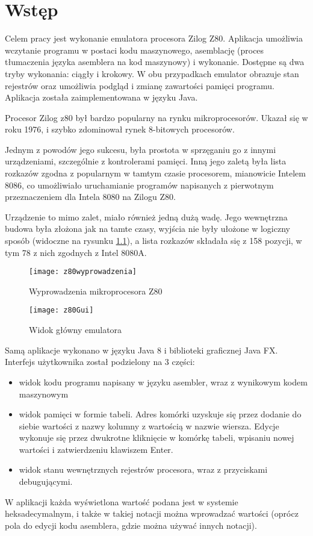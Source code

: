 \chapter{Wstęp}

	Celem pracy jest wykonanie emulatora procesora Zilog Z80. Aplikacja umożliwia wczytanie programu w postaci kodu maszynowego, asemblację (proces tłumaczenia języka asemblera na kod maszynowy) i wykonanie. Dostępne są dwa tryby wykonania: ciągły i krokowy. W obu przypadkach emulator obrazuje stan rejestrów oraz umożliwia podgląd i zmianę zawartości pamięci programu. Aplikacja została zaimplementowana w języku Java.
	
	Procesor Zilog z80 był bardzo popularny na rynku mikroprocesorów\cite{karczmarczuk}. 
	Ukazał się w roku 1976, i szybko zdominował rynek 8-bitowych procesorów.
	
	Jednym z powodów jego sukcesu, była prostota w sprzęganiu go z innymi urządzeniami, szczególnie z kontrolerami pamięci. Inną jego zaletą była lista rozkazów zgodna z popularnym w tamtym czasie procesorem, mianowicie Intelem 8086, co umożliwiało uruchamianie programów napisanych z pierwotnym przeznaczeniem dla Intela 8080 na Zilogu Z80\cite{karczmarczuk}. 
	
	Urządzenie to mimo zalet, miało również jedną dużą wadę. Jego wewnętrzna budowa była złożona jak na tamte czasy, wyjścia nie były ułożone w logiczny sposób (widoczne na rysunku  \ref{img:z80wyprowadzenia}), a lista rozkazów składała się z 158 pozycji, w tym 78 z nich zgodnych z Intel 8080A\cite{manual}. 
	
	
	\begin{figure}[h]
		\centering
		\texttt{[image: z80wyprowadzenia]}
		\caption{Wyprowadzenia mikroprocesora Z80 \cite{karczmarczuk}}
		\label{img:z80wyprowadzenia}
	\end{figure}
			
	\begin{figure}[h]		
		\centering
		\texttt{[image: z80Gui]}
		\caption{Widok główny emulatora}
	\end{figure}
	
	Samą aplikacje wykonano w języku Java 8 i biblioteki graficznej Java FX. 
	Interfejs użytkownika został podzielony na 3 części: 
	\begin{itemize}  
		\item widok kodu programu napisany w języku asembler, wraz z  wynikowym kodem maszynowym  
		\item widok pamięci w formie tabeli. Adres komórki uzyskuje się przez dodanie do siebie wartości z nazwy kolumny z wartością w nazwie wiersza. Edycje wykonuje się przez dwukrotne kliknięcie w komórkę tabeli, wpisaniu nowej wartości i zatwierdzeniu klawiszem Enter.
		\item widok stanu wewnętrznych rejestrów procesora, wraz z przyciskami debugującymi.   
	\end{itemize}
	
	W aplikacji każda wyświetlona wartość podana jest w systemie heksadecymalnym, i także w takiej notacji można wprowadzać wartości (oprócz pola do edycji kodu asemblera, gdzie można używać innych notacji).
	